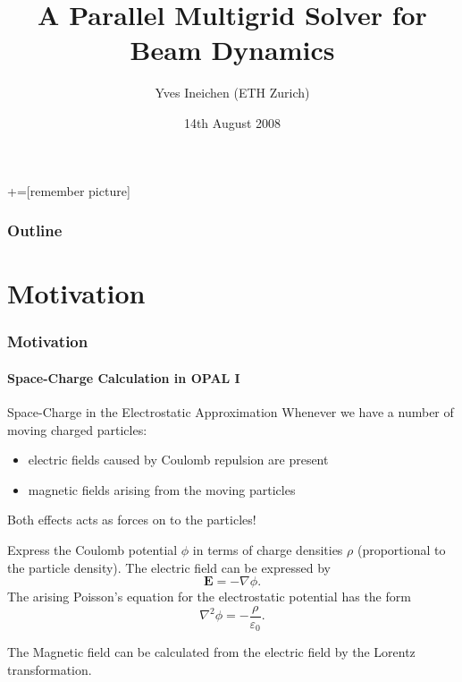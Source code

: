 \documentclass[xcolor=pdftex,table,10pt]{beamer}
\title{A Parallel Multigrid Solver for Beam Dynamics}
\author{Yves Ineichen (ETH Zurich)}
\institute{\textbf{Master Thesis} \\ Supervisor: Andreas Adelmann (PSI) \\ Supervising Professor: Peter Arbenz (ETH)}
\date{14th August 2008}
\newcommand{\opal}{\textsc{OPAL }}
\begin{document}
+=[remember picture]

\everymath{\displaystyle}

	\lstset{language=C++, basicstyle=\small}

	\begin{frame}
		\titlepage
	\end{frame}
	
	\begin{frame}
	  \frametitle{Outline}
	  \tableofcontents
	\end{frame}

	\section{Motivation}

	\begin{frame}
		\frametitle{Motivation}
		\framesubtitle{Space-Charge Calculation in \opal I}
		
		\begin{block}{Space-Charge in the Electrostatic Approximation}
			Whenever we have a number of moving charged particles:
			\begin{itemize}
				\item electric fields  caused by Coulomb repulsion are present
				\item magnetic fields arising from the moving particles
			\end{itemize}
		Both effects acts as \alert{forces} on to the particles!	
		\end{block}

		\pause
		\vspace{0.5cm}

		Express the Coulomb potential $\phi$ in terms of charge densities $\rho$ (proportional to the particle density). The electric field can be expressed by 
		\[
			\mathbf{E} = - \nabla \phi \text{.}
		\]
		The arising Poisson's equation for the electrostatic potential has the form
		\[
			\nabla^2 \phi = - \frac{\rho}{\varepsilon_0}\text{.}
		\]

		The Magnetic field can be calculated from the electric field by the Lorentz transformation.
		

	\end{frame}
	
\end{document}
